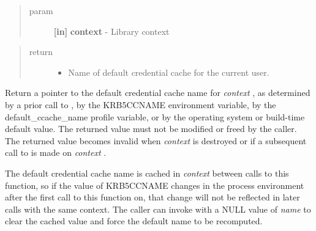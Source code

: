 \documentclass[letterpaper,10pt,english]{sphinxmanual}
\begin{document}
\begin{fulllineitems}
\label{appdev/refs/api/krb5_cc_default_name:c.krb5_cc_default_name}
\end{fulllineitems}

\begin{quote}\begin{description}
\item[{param}] \leavevmode
\textbf{{[}in{]}} \textbf{context} - Library context

\end{description}\end{quote}
\begin{quote}\begin{description}
\item[{return}] \leavevmode\begin{itemize}
\item {} 
Name of default credential cache for the current user.

\end{itemize}

\end{description}\end{quote}

Return a pointer to the default credential cache name for \emph{context} , as determined by a prior call to {\hyperref[appdev/refs/api/krb5_cc_set_default_name:c.krb5_cc_set_default_name]{}} , by the KRB5CCNAME environment variable, by the default\_ccache\_name profile variable, or by the operating system or build-time default value. The returned value must not be modified or freed by the caller. The returned value becomes invalid when \emph{context} is destroyed {\hyperref[appdev/refs/api/krb5_free_context:c.krb5_free_context]{}} or if a subsequent call to {\hyperref[appdev/refs/api/krb5_cc_set_default_name:c.krb5_cc_set_default_name]{}} is made on \emph{context} .

The default credential cache name is cached in \emph{context} between calls to this function, so if the value of KRB5CCNAME changes in the process environment after the first call to this function on, that change will not be reflected in later calls with the same context. The caller can invoke {\hyperref[appdev/refs/api/krb5_cc_set_default_name:c.krb5_cc_set_default_name]{}} with a NULL value of \emph{name} to clear the cached value and force the default name to be recomputed.
\end{document}
